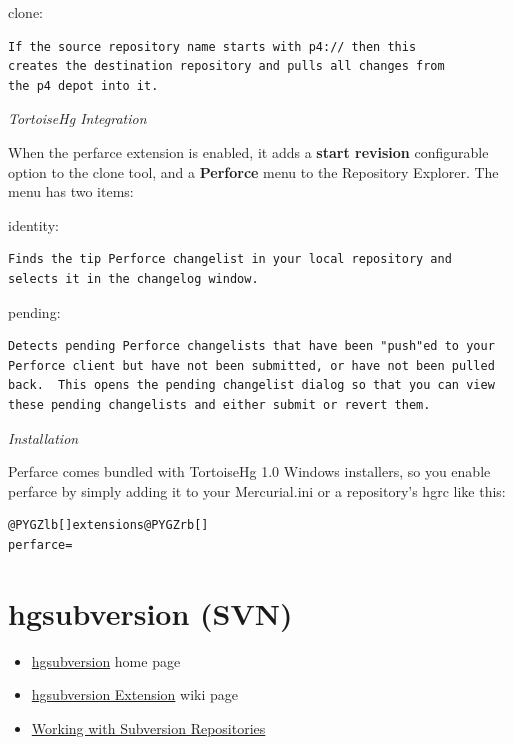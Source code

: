\documentclass[letterpaper,10pt,english]{manual}
\begin{document}
clone:

\begin{Verbatim}[commandchars=@\[\]]
If the source repository name starts with p4:// then this
creates the destination repository and pulls all changes from
the p4 depot into it.
\end{Verbatim}

\emph{TortoiseHg Integration}

When the perfarce extension is enabled, it adds a \textbf{start revision}
configurable option to the clone tool, and a \textbf{Perforce} menu
to the Repository Explorer.  The menu has two items:

identity:

\begin{Verbatim}[commandchars=@\[\]]
Finds the tip Perforce changelist in your local repository and
selects it in the changelog window.
\end{Verbatim}

pending:

\begin{Verbatim}[commandchars=@\[\]]
Detects pending Perforce changelists that have been "push"ed to your
Perforce client but have not been submitted, or have not been pulled
back.  This opens the pending changelist dialog so that you can view
these pending changelists and either submit or revert them.
\end{Verbatim}

\emph{Installation}

Perfarce comes bundled with TortoiseHg 1.0 Windows installers, so you
enable perfarce by simply adding it to your Mercurial.ini or a
repository's hgrc like this:

\begin{Verbatim}[commandchars=@\[\]]
@PYGZlb[]extensions@PYGZrb[]
perfarce=
\end{Verbatim}


\section{hgsubversion (SVN)}
\begin{itemize}
\item {} 
\href{http://bitbucket.org/durin42/hgsubversion/wiki/Home}{hgsubversion} home page

\item {} 
\href{http://mercurial.selenic.com/wiki/HgSubversion}{hgsubversion Extension} wiki page

\item {} 
\href{http://mercurial.selenic.com/wiki/WorkingWithSubversion}{Working with Subversion Repositories}

\end{itemize}
\end{document}

